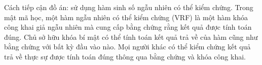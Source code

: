 \documentclass[../main.tex]{subfiles}
\begin{document}
Cách tiếp cận đồ án: sử dụng hàm sinh số ngẫu nhiên có thể kiểm chứng. Trong mật mã học, một hàm ngẫu nhiên có thể kiểm chứng (VRF) là một hàm khóa công khai giả ngẫu nhiên mà cung cấp bằng chứng rằng kết quả được tính toán đúng. Chủ sở hữu khóa bí mật có thể tính toán kết quả trả về của hàm cũng như bằng chứng với bất kỳ đầu vào nào. Mọi người khác có thể kiểm chứng kết quả trả về thực sự được tính toán đúng thông qua bằng chứng và khóa công khai.
\end{document}
